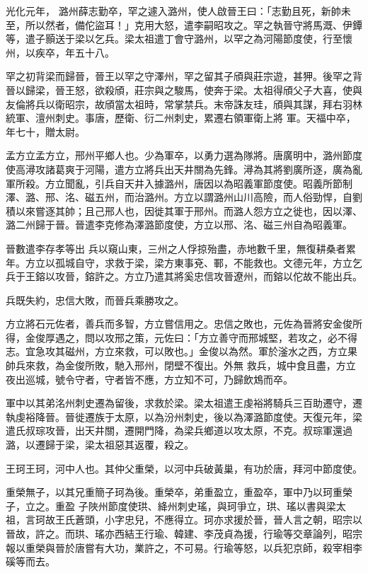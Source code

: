 \begin{pinyinscope}
 光化元年，
 潞州薛志勤卒，罕之遽入潞州，使人啟晉王曰：「志勤且死，新帥未至，所以然者，備佗盜耳！」克用大怒，遣李嗣昭攻之。罕之執晉守將馬溉、伊鐔等，遣子顥送于梁以乞兵。梁太祖遣丁會守潞州，以罕之為河陽節度使，行至懷州，以疾卒，年五十八。



 罕之初背梁而歸晉，晉王以罕之守澤州，罕之留其子頎與莊宗遊，甚狎。後罕之背晉以歸梁，晉王怒，欲殺頎，莊宗與之駿馬，使奔于梁。太祖得頎父子大喜，使與友倫將兵以衛昭宗，故頎當太祖時，常掌禁兵。末帝誅友珪，頎與其謀，拜右羽林統軍、澶州刺史。事唐，歷衛、衍二州刺史，累遷右領軍衛上將
 軍。天福中卒，年七十，贈太尉。



 孟方立孟方立，邢州平鄉人也。少為軍卒，以勇力選為隊將。唐廣明中，潞州節度使高潯攻諸葛爽于河陽，遣方立將兵出天井關為先鋒。潯為其將劉廣所逐，廣為亂軍所殺。方立聞亂，引兵自天井入據潞州，唐因以為昭義軍節度使。昭義所節制澤、潞、邢、洺、磁五州，而治潞州。方立以謂潞州山川高險，而人俗勁悍，自劉積以來嘗逐其帥；且己邢人也，因徙其軍于邢州。而潞人怨方立之徙也，因以澤、潞二州歸于晉。晉遣李克修為澤潞節度使，方立以邢、洺、磁三州自為昭義軍。



 晉數遣李存孝等出
 兵以窺山東，三州之人俘掠殆盡，赤地數千里，無復耕桑者累年。方立以孤城自守，求救于梁，梁方東事兗、鄆，不能救也。文德元年，方立乞兵于王鎔以攻晉，鎔許之。方立乃遣其將奚忠信攻晉遼州，而鎔以佗故不能出兵。



 兵既失約，忠信大敗，而晉兵乘勝攻之。



 方立將石元佐者，善兵而多智，方立嘗信用之。忠信之敗也，元佐為晉將安金俊所得，金俊厚遇之，問以攻邢之策，元佐曰：「方立善守而邢城堅，若攻之，必不得志。宜急攻其磁州，方立來救，可以敗也。」金俊以為然。軍於滏水之西，方立果帥兵來救，為金俊所敗，馳入邢州，閉壁不復出。外無
 救兵，城中食且盡，方立夜出巡城，號令守者，守者皆不應，方立知不可，乃歸飲鴆而卒。



 軍中以其弟洺州刺史遷為留後，求救於梁。梁太祖遣王虔裕將騎兵三百助遷守，遷執虔裕降晉。晉徙遷族于太原，以為汾州刺史，後以為澤潞節度使。天復元年，梁遣氏叔琮攻晉，出天井關，遷開門降，為梁兵鄉道以攻太原，不克。叔琮軍還過潞，以遷歸于梁，梁太祖惡其返覆，殺之。



 王珂王珂，河中人也。其仲父重榮，以河中兵破黃巢，有功於唐，拜河中節度使。



 重榮無子，以其兄重簡子珂為後。重榮卒，弟重盈立，重盈卒，軍中乃以珂重榮子，立之。重盈
 子陜州節度使珙、絳州刺史瑤，與珂爭立，珙、瑤以書與梁太祖，言珂故王氏蒼頭，小字忠兒，不應得立。珂亦求援於晉，晉人言之朝，昭宗以晉故，許之。而珙、瑤亦西結王行瑜、韓建、李茂貞為援，行瑜等交章論列，昭宗報以重榮與晉於唐嘗有大功，業許之，不可易。行瑜等怒，以兵犯京師，殺宰相李磎等而去。




\end{pinyinscope}
